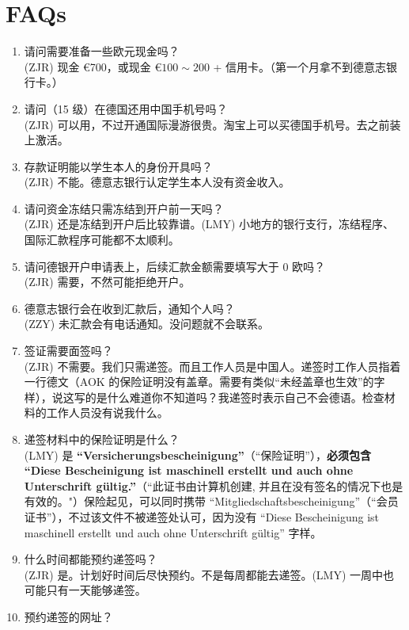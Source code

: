 \documentclass{ctexart}
\begin{document}
\section{FAQs}\label{chap:faq}
\begin{enumerate}
  \item 请问需要准备一些欧元现金吗？ \\
  (ZJR) 现金 \euro{700}，或现金 \euro{$100 \sim 200$} + 信用卡。（第一个月拿不到德意志银行卡。）
  \item 请问（15 级）在德国还用中国手机号吗？ \\
  (ZJR) 可以用，不过开通国际漫游很贵。淘宝上可以买德国手机号。去之前装上激活。
  \item 存款证明能以学生本人的身份开具吗？ \\
  (ZJR) 不能。德意志银行认定学生本人没有资金收入。
  \item 请问资金冻结只需冻结到开户前一天吗？ \\
  (ZJR) 还是冻结到开户后比较靠谱。(LMY) 小地方的银行支行，冻结程序、国际汇款程序可能都不太顺利。
  \item 请问德银开户申请表上，后续汇款金额需要填写大于 0 欧吗？ \\
  (ZJR) 需要，不然可能拒绝开户。
  \item 德意志银行会在收到汇款后，通知个人吗？ \\
  (ZZY) 未汇款会有电话通知。没问题就不会联系。
  \item 签证需要面签吗？ \\
  (ZJR) 不需要。我们只需递签。而且工作人员是中国人。递签时工作人员指着一行德文（AOK 的保险证明没有盖章。需要有类似“未经盖章也生效”的字样），说这写的是什么难道你不知道吗？我递签时表示自己不会德语。检查材料的工作人员没有说我什么。
  \item 递签材料中的保险证明是什么？ \\
  (LMY) 是 \textbf{``Versicherungsbescheinigung''}（“保险证明”），\textbf{必须包含 ``Diese Bescheinigung ist maschinell erstellt und auch ohne Unterschrift gültig.''}（“此证书由计算机创建, 并且在没有签名的情况下也是有效的。"）{\color{gray}保险起见，可以同时携带 ``Mitgliedschaftsbescheinigung''（“会员证书”），不过该文件不被递签处认可，因为没有 ``Diese Bescheinigung ist maschinell erstellt und auch ohne Unterschrift gültig'' 字样。}
  \item 什么时间都能预约递签吗？ \\
  (ZJR) 是。计划好时间后尽快预约。不是每周都能去递签。(LMY) 一周中也可能只有一天能够递签。
  \item 预约递签的网址？ \\

\end{enumerate}
\end{document}
